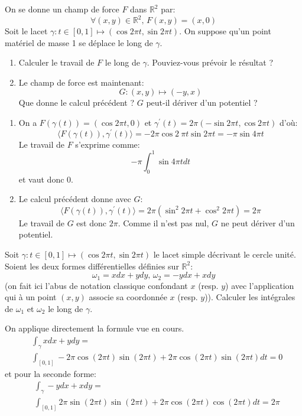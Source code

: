 \documentclass[a4paper, 12pt]{amsart}
\begin{document}
\begin{fex}
On se donne un champ de force $F$ dans $\mathbb{R}^2$ par:
\[
\forall (x,y) \in \mathbb{R}^2, \, F(x,y) = \left(x,0\right)
\]
Soit le lacet $\gamma \colon t \in [0,1] \mapsto (\cos 2 \pi t, \sin 2 \pi t)$.
On suppose qu'un point matériel de masse 1 se déplace le long de $\gamma$.
\begin{enumerate}
  \item Calculer le travail de $F$ le long de $\gamma$. Pouviez-vous prévoir le
  résultat ?
  \item Le champ de force est maintenant:
  \[
  G \colon (x,y) \mapsto (-y,x)
  \]
  Que donne le calcul précédent ? $G$ peut-il dériver d'un potentiel ?
\end{enumerate}
\end{fex}
\begin{enumerate}
\item On a $F(\gamma(t)) = \left(\cos 2 \pi t, 0 \right)$ et $\gamma^\prime(t) = 2 \pi \left(-\sin 2 \pi t, \cos 2 \pi t \right)$ d'où:
\[
\langle F\left(\gamma(t)\right), \gamma^\prime(t) \rangle = -2 \pi \cos 2\ \pi t \sin 2 \pi t = - \pi \sin 4 \pi t
\]
Le travail de $F$ s'exprime comme:
\[
- \pi \int_0^1 \sin 4 \pi t dt
\]
et vaut donc 0.
\item Le calcul précédent donne avec $G$:
\[
\langle F\left(\gamma(t)\right), \gamma^\prime(t) \rangle = 2 \pi \left( \sin^2 2 \pi t + \cos^2 2 \pi t \right) = 2 \pi
\]
Le travail de $G$ est donc $2 \pi$.
Comme il n'est pas nul, $G$ ne peut dériver d'un potentiel.
\end{enumerate}
\begin{fex}
Soit $\gamma \colon t \in [0,1] \mapsto (\cos 2 \pi t, \sin 2 \pi t)$ le lacet
simple décrivant le cercle unité. Soient les deux formes différentielles
définies sur $\mathbb{R}^2$:
\[
\omega_1 =  x dx + y dy, \, \omega_2 = -y dx + x dy
\]
(on fait ici l'abus de notation classique confondant $x$ (resp. $y$) avec
l'application qui à un point $(x,y)$ associe sa coordonnée $x$ (resp. $y$)).
Calculer les intégrales de $\omega_1$ et $\omega_2$ le long de $\gamma$.
\end{fex}
On applique directement la formule vue en cours.
\begin{align*}
&\int_{\gamma} x dx + y dy = \\ 
& \int_{[0,1]} - 2 \pi \cos\left( 2 \pi t \right) \sin\left( 2 \pi t \right) + 2 \pi \cos\left( 2 \pi t \right) \sin\left( 2 \pi t \right) dt = 0
\end{align*}
et pour la seconde forme:
\begin{align*}
&\int_{\gamma} -y dx + x dy = \\ 
& \int_{[0,1]}  2 \pi \sin\left( 2 \pi t \right) \sin\left( 2 \pi t \right) + 2 \pi \cos\left( 2 \pi t \right) \cos\left( 2 \pi t \right) dt = 2 \pi 
\end{align*}
\end{document}
